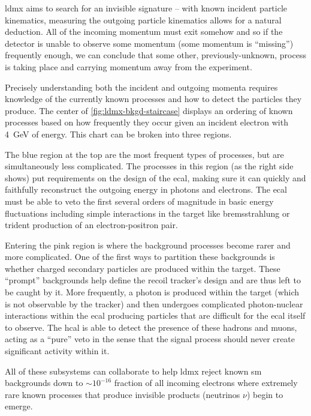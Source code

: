 \ac{ldmx} aims to search for an invisible signature -- with known incident particle kinematics,
measuring the outgoing particle kinematics allows for a natural deduction. All of the incoming
momentum must exit somehow and so if the detector is unable to observe some momentum (some momentum
is ``missing'') frequently enough, we can conclude that some other, previously-unknown, process
is taking place and carrying momentum away from the experiment.

Precisely understanding both the incident and outgoing momenta requires knowledge of the currently
known processes and how to detect the particles they produce. The center of
\cref{fig:ldmx-bkgd-staircase} displays an ordering of known processes based on how frequently they
occur given an incident electron with \qty{4}{\giga\electronvolt} of energy. This chart can be
broken into three regions.

The blue region at the top are the most frequent types of processes, but are simultaneously less
complicated. The processes in this region (as the right side shows) put requirements on the design
of the \ac{ecal}, making sure it can quickly and faithfully reconstruct the outgoing energy in photons
and electrons.
The \ac{ecal} must be able to veto the first several orders of magnitude in basic energy fluctuations
including simple interactions in the target like bremsstrahlung or trident production of an
electron-positron pair.

Entering the pink region is where the background processes become rarer and more complicated. One
of the first ways to partition these backgrounds is whether charged secondary particles are
produced within the target. These ``prompt'' backgrounds help define the recoil tracker's design
and are thus left to be caught by it. More frequently, a photon is produced within the target
(which is not observable by the tracker) and then undergoes complicated photon-nuclear interactions
within the \ac{ecal} producing particles that are difficult for the \ac{ecal} itself to observe.
The \ac{hcal} is able to detect the presence of these hadrons and muons, acting as a ``pure'' veto
in the sense that the signal process should never create significant activity within it.

All of these subsystems can collaborate to help \ac{ldmx} reject known \ac{sm} backgrounds down to
$\sim 10^{-16}$ fraction of all incoming electrons where extremely rare known processes that
produce invisible products (neutrinos $\nu$) begin to emerge.

